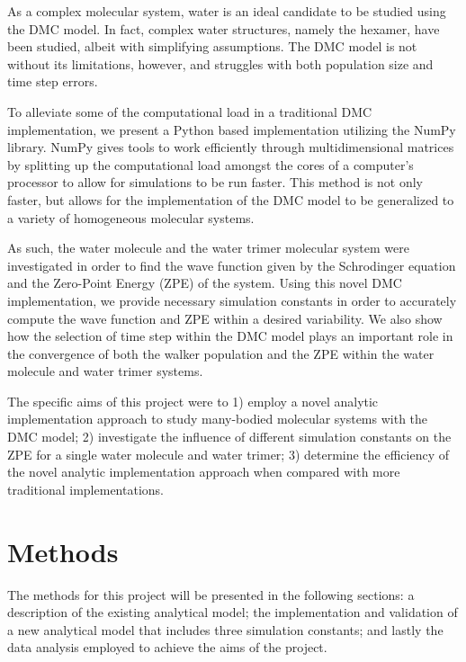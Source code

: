 \documentclass[journal=jacsat,manuscript=article]{achemso}
\begin{document}
As a complex molecular system, water is an ideal candidate to be studied using the DMC model\cite{Reynolds1982}. In fact, complex water structures, namely the hexamer, have been studied\cite{Babin2013,Severson1999}, albeit with simplifying assumptions. The DMC model is not without its limitations, however, and struggles with both population size\cite{Mallory2015} and time step\cite{Urimgar1993} errors. 

To alleviate some of the computational load in a traditional DMC implementation, we present a Python based implementation utilizing the NumPy library. NumPy gives tools to work efficiently through multidimensional matrices by splitting up the computational load amongst the cores of a computer’s processor to allow for simulations to be run faster. This method is not only faster, but allows for the implementation of the DMC model to be generalized to a variety of homogeneous molecular systems. 

As such, the water molecule and the water trimer molecular system were investigated in order to find the wave function given by the Schrodinger equation and the Zero-Point Energy\cite{Gregory1996} (ZPE) of the system. Using this novel DMC implementation, we provide necessary simulation constants in order to accurately compute the wave function and ZPE within a desired variability. We also show how the selection of time step within the DMC model plays an important role in the convergence of both the walker population and the ZPE within the water molecule and water trimer systems. 
	
The specific aims of this project were to 1) employ a novel analytic implementation approach to study many-bodied molecular systems with the DMC model; 2) investigate the influence of different simulation constants on the ZPE for a single water molecule and water trimer; 3) determine the efficiency of the novel analytic implementation approach when compared with more traditional implementations. 


\section{Methods}

The methods for this project will be presented in the following sections: a description of the existing analytical model; the implementation and validation of a new analytical model that includes three simulation constants; and lastly the data analysis employed to achieve the aims of the project. 
\end{document}
